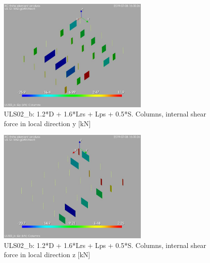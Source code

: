 \begin{figure}
\begin{center}
\includegraphics[width=75mm]{annex_res_columns/graphics/resSimplLC/ULS02_bcolumnsQy}
\caption{ULS02\_b: 1.2*D + 1.6*Lrs + Lps + 0.5*S. Columns, internal shear force in local direction y [kN]}
\end{center}
\end{figure}
\begin{figure}
\begin{center}
\includegraphics[width=75mm]{annex_res_columns/graphics/resSimplLC/ULS02_bcolumnsQz}
\caption{ULS02\_b: 1.2*D + 1.6*Lrs + Lps + 0.5*S. Columns, internal shear force in local direction z [kN]}
\end{center}
\end{figure}


